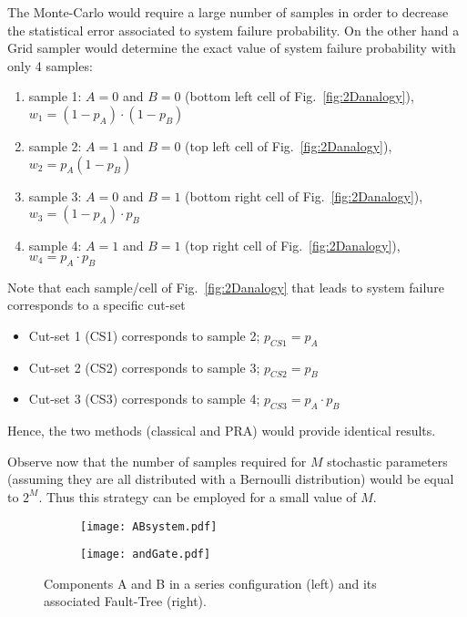 The Monte-Carlo would require a large number of samples in order to decrease the statistical error associated
to system failure probability.
On the other hand a Grid sampler would determine the exact value of system failure probability with only 4 samples:
\begin{enumerate}
  \item sample 1: $A=0$ and $B=0$ (bottom left cell of Fig.~\ref{fig:2Danalogy}), $w_1 = (1-p_A) \cdot (1-p_B)$
  \item sample 2: $A=1$ and $B=0$ (top left cell of Fig.~\ref{fig:2Danalogy}), $w_2 = p_A (1-p_B)$
  \item sample 3: $A=0$ and $B=1$ (bottom right cell of Fig.~\ref{fig:2Danalogy}), $w_3 = (1-p_A) \cdot p_B$
  \item sample 4: $A=1$ and $B=1$ (top right cell of Fig.~\ref{fig:2Danalogy}), $w_4 = p_A \cdot p_B$
\end{enumerate}
Note that each sample/cell of Fig.~\ref{fig:2Danalogy} that leads to system failure corresponds to a specific cut-set
\begin{itemize}
  \item Cut-set 1 (CS1) corresponds to sample 2; $p_{CS1} = p_A$
  \item Cut-set 2 (CS2) corresponds to sample 3; $p_{CS2} = p_B$
  \item Cut-set 3 (CS3) corresponds to sample 4; $p_{CS3} = p_A \cdot p_B$
\end{itemize}
Hence, the two methods (classical and PRA) would provide identical results.

Observe now that the number of samples required for $M$ stochastic parameters (assuming they are all distributed with 
a Bernoulli distribution) would be equal to $2^M$. Thus this strategy can be employed for a small value of $M$.

\begin{figure}
  \centering
  \begin{subfigure}{.5\textwidth}
    \centering
    \texttt{[image: ABsystem.pdf]}
    \label{fig:sub1}
  \end{subfigure}%
  \begin{subfigure}{.5\textwidth}
    \centering
    \texttt{[image: andGate.pdf]}
    \label{fig:sub2}
  \end{subfigure}
  \caption{Components A and B in a series configuration (left) and its associated Fault-Tree (right).}
  \label{fig:ABsystem}
\end{figure}

